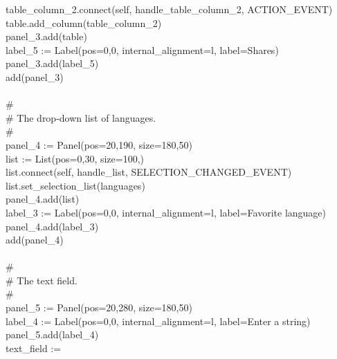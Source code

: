 {\>   \ \ \ table\_column\_2.connect(self,
{\textquotedbl}handle\_table\_column\_2{\textquotedbl}, ACTION\_EVENT) \\
\>   \ \ \ table.add\_column(table\_column\_2) \\
\>   \ \ \ panel\_3.add(table) \\
\>   \ \ \ label\_5 := Label({\textquotedbl}pos=0,0{\textquotedbl},
{\textquotedbl}internal\_alignment=l{\textquotedbl},
{\textquotedbl}label=Shares{\textquotedbl}) \\
\>   \ \ \ panel\_3.add(label\_5) \\
\>   \ \ \ add(panel\_3) \\
\ \\
\>   \ \ \ \# \\
\>   \ \ \ \# The drop-down list of languages. \\
\>   \ \ \ \# \\
\>   \ \ \ panel\_4 := Panel({\textquotedbl}pos=20,190{\textquotedbl},
{\textquotedbl}size=180,50{\textquotedbl}) \\
\>   \ \ \ list := List({\textquotedbl}pos=0,30{\textquotedbl},
{\textquotedbl}size=100,{\textquotedbl}) \\
\>   \ \ \ list.connect(self,
{\textquotedbl}handle\_list{\textquotedbl}, SELECTION\_CHANGED\_EVENT) \\
\>   \ \ \ list.set\_selection\_list(languages) \\
\>   \ \ \ panel\_4.add(list) \\
\>   \ \ \ label\_3 := Label({\textquotedbl}pos=0,0{\textquotedbl},
{\textquotedbl}internal\_alignment=l{\textquotedbl},
{\textquotedbl}label=Favorite language{\textquotedbl}) \\
\>   \ \ \ panel\_4.add(label\_3) \\
\>   \ \ \ add(panel\_4) \\
\ \\
\>   \ \ \ \# \\
\>   \ \ \ \# The text field. \\
\>   \ \ \ \# \\
\>   \ \ \ panel\_5 := Panel({\textquotedbl}pos=20,280{\textquotedbl},
{\textquotedbl}size=180,50{\textquotedbl}) \\
\>   \ \ \ label\_4 := Label({\textquotedbl}pos=0,0{\textquotedbl},
{\textquotedbl}internal\_alignment=l{\textquotedbl},
{\textquotedbl}label=Enter a string{\textquotedbl}) \\
\>   \ \ \ panel\_5.add(label\_4) \\
\>   \ \ \ text\_field :=
}
